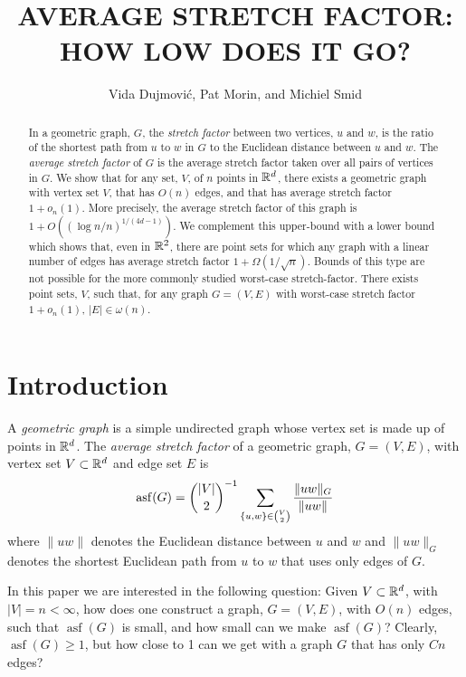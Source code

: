 \documentclass{patmorin}
\title{\MakeUppercase{Average Stretch Factor: How Low Does It Go?}}
\author{Vida Dujmovi\'c, Pat Morin, and Michiel Smid}
\DeclareMathOperator{\asf}{asf}
\begin{document}
\begin{titlepage}
\maketitle

\begin{abstract}
  In a geometric graph, $G$, the \emph{stretch factor} between
  two vertices, $u$ and $w$, is the ratio of the shortest path from
  $u$ to $w$ in $G$ to the Euclidean distance between $u$ and $w$.
  The \emph{average stretch factor} of $G$ is the average stretch factor
  taken over all pairs of vertices in $G$.  We show that for any set,
  $V$, of $n$ points in $\mathbb{R}^d$, there exists a geometric graph with
  vertex set $V$, that has $O(n)$ edges, and that has average stretch
  factor $1+ o_n(1)$.  More precisely, the average stretch factor of this
  graph is $1+O((\log n/n)^{1/(4d-1)})$.  We complement this upper-bound
  with a lower bound which shows that, even in $\mathbb{R}^2$, there are point
  sets for which any graph with a linear number of edges has average
  stretch factor $1+\Omega(1/\sqrt{n})$.  Bounds of this type are not
  possible for the more commonly studied worst-case stretch-factor.
  There exists point sets, $V$, such that, for any graph $G=(V,E)$
  with worst-case stretch factor $1+o_n(1)$, $|E|\in\omega(n)$.
\end{abstract}

\end{titlepage}

\section{Introduction}

A \emph{geometric graph} is a simple undirected graph whose vertex set
is made up of  points in $\mathbb{R}^d$.  The \emph{average stretch factor}
of a geometric graph, $G=(V,E)$, with vertex set $V\subset \mathbb{R}^d$ and
edge set $E$ is
\begin{equation}
    \asf(G) = \binom{|V|}{2}^{-1}\sum_{\{u,w\}\in\binom{V}{2}}\frac{\|uw\|_G}{\|uw\|} \eqlabel{asf}
\end{equation}
where $\|uw\|$ denotes the Euclidean distance between $u$ and $w$
and $\|uw\|_G$ denotes the shortest Euclidean path from $u$ to $w$
that uses only edges of $G$.

In this paper we are interested in the following question: Given
$V\subset\mathbb{R}^d$, with $|V|=n<\infty$, how does one construct a graph,
$G=(V,E)$, with $O(n)$ edges, such that $\asf(G)$ is small, and how small
can we make $\asf(G)$?  Clearly, $\asf(G)\ge 1$, but how close to 1 can
we get with a graph $G$ that has only $Cn$ edges?
\end{document}
